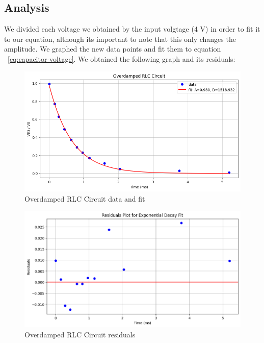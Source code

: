 \documentclass[11pt]{article}
\begin{document}
    \subsection{Analysis}\label{subsec:part2b_analysis}
    We divided each voltage we obtained by the input volgtage (4 V) in
    order to fit it to our equation, although its important to note that
    this only changes the amplitude. We graphed the new data points and fit
    them to equation ~\ref{eq:capacitor-voltage}. We obtained the following
    graph and its residuals:

    \begin{figure}[H]
        \centering
        \includegraphics[width=1.0\linewidth]{resources/images/rlc 2b fit}
        \caption{Overdamped RLC Circuit data and fit}
    \end{figure}

    \begin{figure}[H]
        \centering
        \includegraphics[width=1.0\linewidth]{resources/images/rlc 2b fit residuals}
        \caption{Overdamped RLC Circuit residuals}
    \end{figure}
\end{document}
